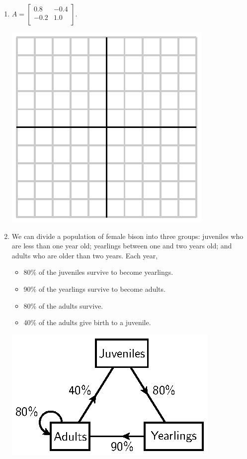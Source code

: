 \documentclass[12pt]{article}
\begin{document}
\begin{enumerate}
\item
  $A =
  \left[
    \begin{array}{cc}
      0.8 & -0.4 \\
      -0.2 & 1.0 \\
    \end{array}
  \right].
  $

  \includegraphics{empty.eps}

\item We can divide a population of female bison into three groups:
  juveniles who are less than one year old; yearlings between one and
  two years old; and adults who are older than two years.   Each year,

  \begin{itemize}
  \item 80\% of the juveniles survive to become yearlings.
  \item 90\% of the yearlings survive to become adults.
  \item 80\% of the adults survive. 
  \item 40\% of the adults give birth to a juvenile.
  \end{itemize}

  \begin{center}
    \includegraphics{eigen-3d-species.eps}
  \end{center}


\end{enumerate}
\end{document}
